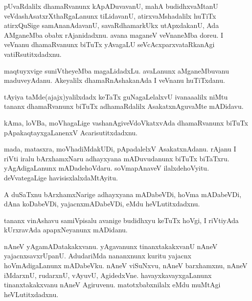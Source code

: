 \documentclass{article}
\begin{document}
\begin{mn}
pUvaRdalilx dhamaRvanunx kApADuvavanU,  mahA budidhxvaMtanU  veVdashAsatxrXthaRgaLanunx 
tiLidavanU, atirxvaMshadalilx huTiTx atirxQuSige samAnanAdavanU, savaRdhamarkUkx 
utApxdakanU, Ada AMganeMba obabx rAjanidadxnu. avana maganeV veVnaneMba doreu. 
I veVnanu dhamaRvanunx biTuTx yAvagaLU seVcAcxparxvataRkanAgi vatiRsutitxdadxnu.
\end{mn}

\begin{mn}
maqtuyxvige suniVtheyeMba magaLidadxLu.  avaLanunx aMganeMbuvanu maduveyAdanu. 
Akeyalilx dhamaRnAshakanAda I veVnanu huTiTxdanu. 
\end{mn}

\begin{mn}
tAyiya taMde(ajajx)yalilxdadx keTaTx guNagaLelalxvU ivanaaalilx niMtu 
tananx dhamaRvanunx biTuTx adhamaRdalilx AsakatxnAguvaMte mADidavu.
\end{mn}

\begin{mn}
kAma, loVBa, moVhagaLige vashanAgiveVdoVkatxvAda dhamaRvanunx biTuTx
pApakaqtayxgaLanenxV Acarisutitxdadxnu.
\end{mn}

\begin{mn}
mada, matasxra, moVhadiMdakUDi, pApadalelxV AsakatxnAdanu.  rAjanu I riVti 
iralu bArxhamxNaru adhayxyana mADuvudanunx biTuTx biTaTxru. yAgAdigaLanunx 
mADadehoVdaru. soVmapAnaveV ilalxdehoVyitu. deVvategaLige havisisxlalxdaMtAyitu.
\end{mn}

\begin{mn}
A duSaTxnu bArxhamxNarige adhayxyana mADabeVDi, hoVma mADabeVDi, dAna 
koDabeVDi, yajacnxmADabeVDi, eMdu heVLutitxdadxnu. 
\end{mn}

\begin{mn}
tananx vinAshavu samiVpisalu avanige budidhxyu keTuTx hoVgi, I riVtiyAda 
kUrxravAda apapxNeyanunx mADidanu.
\end{mn}

\begin{mn}
nAneV yAgamADatakakxvanu. yAgavanunx tinanxtakakxvanU nAneV yajacnxsavxrUpanU. 
AdudariMda nananxnunx kuritu yajacnx hoVmAdigaLanunx mADabeVku. nAneV viSuNxvu, 
nAneV barxhamxnu, nAneV iMdarxnU, rudarxnU, vAyuvU, AgidedxVne. 
havayxkavayxgaLanunx tinanxtakakxvanu  nAneV Agiruvenu.  matotxbabxnilalx 
eMdu muMtAgi heVLutitxdadxnu.
\end{mn}
\end{document}
